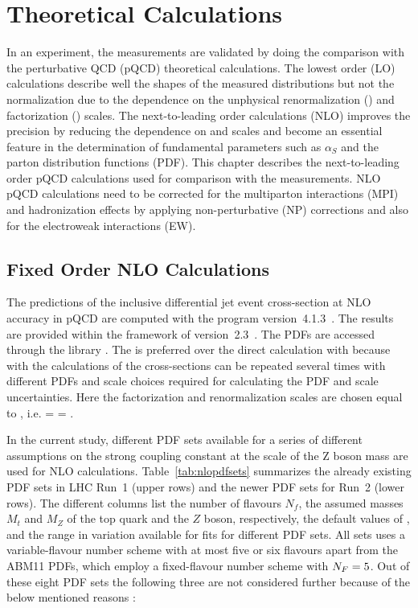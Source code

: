 \chapter{Theoretical Calculations}
\label{chap:Theory_Predictions}

In an experiment, the measurements are validated by doing the comparison with the perturbative QCD (pQCD) theoretical calculations. The lowest order (LO) calculations describe well the shapes of the measured distributions but not the normalization due to the dependence on the unphysical renormalization (\mur) and factorization (\muf) scales. The next-to-leading order calculations (NLO) improves the precision by reducing the dependence on \mur and \muf scales and become an essential feature in the determination of fundamental parameters such as $\alpha_S$ and the parton distribution functions (PDF). This chapter describes the next-to-leading order pQCD calculations used for comparison with the measurements. NLO pQCD calculations need to be corrected for the multiparton interactions (MPI) and hadronization effects by applying non-perturbative (NP) corrections and also for the electroweak interactions (EW).

\section{Fixed Order NLO Calculations}
The predictions of the inclusive differential jet event cross-section at NLO accuracy in pQCD are computed with the \NLOJETPP program version~4.1.3~\cite{Nagy:2001fj,Nagy:2003tz}. The results are provided within the framework of \fastNLO version~2.3~\cite{Kluge:2006xs,Britzger:2012bs}. The PDFs are accessed through the \LHAPDFS library \cite{Whalley:2005nh,Buckley:2014ana}. The \fastNLO is preferred over the direct calculation with \NLOJETPP because with \fastNLO the calculations of the cross-sections can be repeated several times with different PDFs and scale choices required for calculating the PDF and scale uncertainties. Here the factorization and renormalization scales are chosen equal to \httwo, i.e. \muf = \mur = \httwo. 

In the current study, different PDF sets available for a series of different assumptions on the strong coupling constant at the scale of the Z boson mass \alpsmz are used for NLO calculations. Table~\ref{tab:nlopdfsets} summarizes the already existing PDF sets in LHC Run~1 (upper rows) and the newer PDF sets for Run~2 (lower rows). The different columns list the number of flavours $N_f$, the assumed masses $M_t$ and $M_Z$ of the top quark and the $Z$ boson, respectively, the default values of \alpsmz, and the range in \alpsmz variation available for fits for different PDF sets. All sets uses a variable-flavour number scheme with at most five or six flavours apart from the ABM11 PDFs, which employ a fixed-flavour number scheme with $N_F=5$. Out of these eight PDF sets the following three are not considered further because of the below mentioned reasons :

